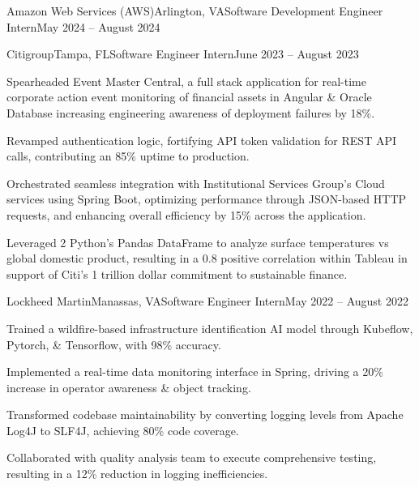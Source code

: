 \documentclass{article}
\begin{document}
\begin{flushleft}
\begin{experience}{Amazon Web Services (AWS)}{Arlington, VA}{Software Development Engineer Intern}{May 2024 -- August 2024}
    \end{experience}

    \begin{experience}{Citigroup}{Tampa, FL}{Software Engineer Intern}{June 2023 -- August 2023}
        \item Spearheaded Event Master Central, a full stack application for real-time corporate action event monitoring of financial assets in Angular \& Oracle Database increasing engineering awareness of deployment failures by 18\%.
        \item Revamped authentication logic, fortifying API token validation for REST API calls, contributing an 85\% uptime to production.
        \item Orchestrated seamless integration with Institutional Services Group's Cloud services using Spring Boot, optimizing performance through JSON-based HTTP requests, and enhancing overall efficiency by 15\% across the application.
        \item Leveraged 2 Python’s Pandas DataFrame to analyze surface temperatures vs global domestic product, resulting in a 0.8 positive correlation within Tableau in support of Citi's 1 trillion dollar commitment to sustainable finance.
    \end{experience}

    \begin{experience}{Lockheed Martin}{Manassas, VA}{Software Engineer Intern}{May 2022 -- August 2022}
        \item Trained a wildfire-based infrastructure identification AI model through Kubeflow, Pytorch, \& Tensorflow, with 98\% accuracy.
        \item Implemented a real-time data monitoring interface in Spring, driving a 20\% increase in operator awareness \& object tracking.
        \item Transformed codebase maintainability by converting logging levels from Apache Log4J to SLF4J, achieving 80\% code coverage.
        \item Collaborated with quality analysis team to execute comprehensive testing, resulting in a 12\% reduction in logging inefficiencies.
        
    \end{experience}
    


    \vspace{3pt}


\end{flushleft}
\end{document}
